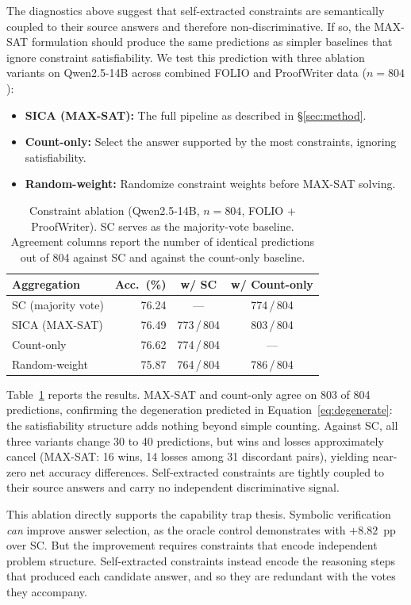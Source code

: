 The diagnostics above suggest that self-extracted constraints are semantically coupled to their source answers and therefore non-discriminative. If so, the MAX-SAT formulation should produce the same predictions as simpler baselines that ignore constraint satisfiability. We test this prediction with three ablation variants on Qwen2.5-14B across combined FOLIO and ProofWriter data ($n = 804$):

\begin{itemize}
\item \textbf{SICA (MAX-SAT):} The full pipeline as described in \S\ref{sec:method}.
\item \textbf{Count-only:} Select the answer supported by the most constraints, ignoring satisfiability.
\item \textbf{Random-weight:} Randomize constraint weights before MAX-SAT solving.
\end{itemize}

\begin{table}[t]
\centering
\small
\caption{Constraint ablation (Qwen2.5-14B, $n = 804$, FOLIO + ProofWriter). SC serves as the majority-vote baseline. Agreement columns report the number of identical predictions out of 804 against SC and against the count-only baseline.}
\label{tab:ablation}
\begin{tabular}{@{}lrcc@{}}
\toprule
Aggregation & Acc.\ (\%) & w/ SC & w/ Count-only \\
\midrule
SC (majority vote) & 76.24 & --- & 774\,/\,804 \\
SICA (MAX-SAT) & 76.49 & 773\,/\,804 & 803\,/\,804 \\
Count-only & 76.62 & 774\,/\,804 & --- \\
Random-weight & 75.87 & 764\,/\,804 & 786\,/\,804 \\
\bottomrule
\end{tabular}
\end{table}

Table~\ref{tab:ablation} reports the results. MAX-SAT and count-only agree on 803 of 804 predictions, confirming the degeneration predicted in Equation~\ref{eq:degenerate}: the satisfiability structure adds nothing beyond simple counting. Against SC, all three variants change 30 to 40 predictions, but wins and losses approximately cancel (MAX-SAT: 16 wins, 14 losses among 31 discordant pairs), yielding near-zero net accuracy differences. Self-extracted constraints are tightly coupled to their source answers and carry no independent discriminative signal.

This ablation directly supports the capability trap thesis. Symbolic verification \emph{can} improve answer selection, as the oracle control demonstrates with $+8.82$~pp over SC. But the improvement requires constraints that encode independent problem structure. Self-extracted constraints instead encode the reasoning steps that produced each candidate answer, and so they are redundant with the votes they accompany.
